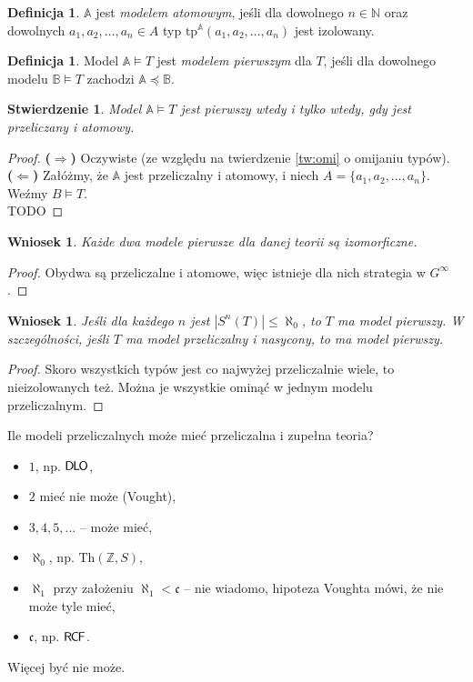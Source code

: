 \documentclass{article}
\newcommand{\N}{\mathbb{N}}
\newcommand{\Z}{\mathbb{Z}}
\newcommand{\A}{\mathbb{A}}
\newcommand{\B}{\mathbb{B}}
\theoremstyle{plain}
\newtheorem{stw}[thm]{Stwierdzenie}
\newtheorem{wn}[thm]{Wniosek}
\theoremstyle{definition}
\newtheorem{df}[thm]{Definicja}
\theoremstyle{remark}
\newcommand{\DLO}{\mathsf{D \mkern-1.5mu L \mkern-1.8mu O}}
\newcommand{\RCF}{\mathsf{R \mkern-1.7mu C \mkern-1.4mu F}}
\newcommand{\Th}{\text{Th}}
\begin{document}
\begin{df}
	$\A$ jest \textit{modelem atomowym}, jeśli dla dowolnego $n \in \N$ oraz dowolnych $a_1, a_2, \ldots, a_n \in A$ typ $\text{tp}^{\A}(a_1, a_2, \ldots, a_n)$ jest izolowany.
\end{df}
\begin{df}
	Model $\A \models T$ jest \textit{modelem pierwszym} dla $T$,
	jeśli dla dowolnego modelu $\B \models T$ zachodzi $\A \preccurlyeq \B$.
\end{df}
\begin{stw}
	 Model $\A \models T$ jest pierwszy wtedy i tylko wtedy, gdy jest przeliczany i atomowy.
\end{stw}
\begin{proof}
	\textbf{($\Rightarrow$)} Oczywiste (ze względu na twierdzenie \ref{tw:omi} o omijaniu typów).
	\\\textbf{($\Leftarrow$)}
	Załóżmy, że $\A$ jest przeliczalny i atomowy, i niech $A = \{a_1, a_2, \ldots, a_n\}$.
	Weźmy $B \models T$.
	\\TODO
\end{proof}
\begin{wn}
	 Każde dwa modele pierwsze dla danej teorii są izomorficzne.
\end{wn}
\begin{proof}
	Obydwa są przeliczalne i atomowe, więc istnieje dla nich strategia w $G^{\infty}$.
\end{proof}

\begin{wn}
	Jeśli dla każdego $n$ jest $|S^n(T)| \leq \aleph_0$, to $T$ ma model pierwszy.
	W szczególności, jeśli $T$ ma model przeliczalny i nasycony, to ma model pierwszy.
\end{wn}
\begin{proof}
	 Skoro wszystkich typów jest co najwyżej przeliczalnie wiele, to nieizolowanych też.
	 Można je wszystkie ominąć w jednym modelu przeliczalnym.
\end{proof}

Ile modeli przeliczalnych może mieć przeliczalna i zupełna teoria?
\begin{itemize}
	\item $1$, np. $\DLO$,
	\item $2$ mieć nie może (Vought),
	\item $3, 4, 5, \ldots$ -- może mieć,
	\item $\aleph_0$, np. $\Th(\Z, S)$,
	\item $\aleph_1$ przy założeniu $\aleph_1 <  \mathfrak{c}$ -- nie wiadomo, hipoteza Voughta mówi, że nie może tyle mieć,
	\item $ \mathfrak{c}$, np. $\RCF$.
\end{itemize}
Więcej być nie może.
\end{document}
